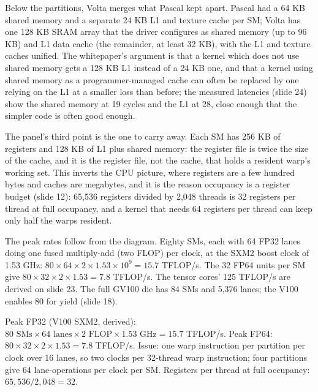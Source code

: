 \documentclass[11pt,letterpaper]{article}
\newenvironment{formulas}{\begin{tcolorbox}[formulabox]}{\end{tcolorbox}}
\begin{document}
Below the partitions, Volta merges what Pascal kept apart. Pascal had a 64 KB shared memory and a separate 24 KB L1 and texture cache per SM; Volta has one 128 KB SRAM array that the driver configures as shared memory (up to 96 KB) and L1 data cache (the remainder, at least 32 KB), with the L1 and texture caches unified. The whitepaper's argument is that a kernel which does not use shared memory gets a 128 KB L1 instead of a 24 KB one, and that a kernel using shared memory as a programmer-managed cache can often be replaced by one relying on the L1 at a smaller loss than before; the measured latencies (slide 24) show the shared memory at 19 cycles and the L1 at 28, close enough that the simpler code is often good enough.

The panel's third point is the one to carry away. Each SM has 256 KB of registers and 128 KB of L1 plus shared memory: the register file is twice the size of the cache, and it is the register file, not the cache, that holds a resident warp's working set. This inverts the CPU picture, where registers are a few hundred bytes and caches are megabytes, and it is the reason occupancy is a register budget (slide 12): 65,536 registers divided by 2,048 threads is 32 registers per thread at full occupancy, and a kernel that needs 64 registers per thread can keep only half the warps resident.

The peak rates follow from the diagram. Eighty SMs, each with 64 FP32 lanes doing one fused multiply-add (two FLOP) per clock, at the SXM2 boost clock of 1.53 GHz: $80\times64\times2\times1.53\times10^9 = 15.7$ TFLOP/s. The 32 FP64 units per SM give $80\times32\times2\times1.53 = 7.8$ TFLOP/s. The tensor cores' 125 TFLOP/s are derived on slide 23. The full GV100 die has 84 SMs and 5,376 lanes; the V100 enables 80 for yield (slide 18).

\begin{formulas}
Peak FP32 (V100 SXM2, derived): $80 \text{ SMs} \times 64 \text{ lanes} \times 2 \text{ FLOP} \times 1.53 \text{ GHz} = 15.7$ TFLOP/s. Peak FP64: $80\times32\times2\times1.53 = 7.8$ TFLOP/s. Issue: one warp instruction per partition per clock over 16 lanes, so two clocks per 32-thread warp instruction; four partitions give 64 lane-operations per clock per SM. Registers per thread at full occupancy: $65{,}536 / 2{,}048 = 32$.
\end{formulas}
\end{document}
